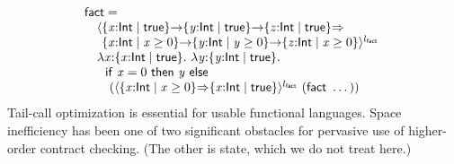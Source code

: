 \documentclass[9pt]{extarticle}
\newcommand{\ottsym}[1]{#1}
\begin{document}
\[ \begin{array}{r@{}l}
  \multicolumn{2}{l}{ \mathsf{fact}  = } \\
  ~~~ &  \langle    \{ \mathit{x} \mathord{:}  \mathsf{Int}  \mathrel{\mid}  \mathsf{true}  \}  \mathord{ \rightarrow }   \{ \mathit{y} \mathord{:}  \mathsf{Int}  \mathrel{\mid}  \mathsf{true}  \}  \mathord{ \rightarrow }  \{ \mathit{z} \mathord{:}  \mathsf{Int}  \mathrel{\mid}  \mathsf{true}  \}     \mathord{ \overset{    }{\Rightarrow} }    {} \\  &  \phantom{\langle}   \{ \mathit{x} \mathord{:}  \mathsf{Int}  \mathrel{\mid}  \mathit{x}  \mathrel{\ge}  \ottsym{0}  \}  \mathord{ \rightarrow }  \{ \mathit{y} \mathord{:}  \mathsf{Int}  \mathrel{\mid}  \mathit{y}  \mathrel{\ge}  \ottsym{0}  \}   \mathord{ \rightarrow }  \{ \mathit{z} \mathord{:}  \mathsf{Int}  \mathrel{\mid}  \mathit{x}  \mathrel{\ge}  \ottsym{0}  \}    \rangle^{  l_{ \mathsf{fact} }  } ~  {} \\  &   \lambda \mathit{x} \mathord{:}  \{ \mathit{x} \mathord{:}  \mathsf{Int}  \mathrel{\mid}  \mathsf{true}  \}  .~   \lambda \mathit{y} \mathord{:}  \{ \mathit{y} \mathord{:}  \mathsf{Int}  \mathrel{\mid}  \mathsf{true}  \}  .~  {} \\  &   ~~   \mathsf{if}~  \mathit{x}  \mathrel{=}  \ottsym{0}  ~\mathsf{then}~ \mathit{y} ~\mathsf{else}~ {} \\  &  \quad   (  \langle   \{ \mathit{x} \mathord{:}  \mathsf{Int}  \mathrel{\mid}  \mathit{x}  \mathrel{\ge}  \ottsym{0}  \}   \mathord{ \overset{    }{\Rightarrow} }   \{ \mathit{x} \mathord{:}  \mathsf{Int}  \mathrel{\mid}  \mathsf{true}  \}   \rangle^{  l_{ \mathsf{fact} }  } ~   (   \mathsf{fact}  ~ \dots  )   )      
\end{array} \]
Tail-call optimization is essential for usable functional
languages. Space inefficiency has been one of two
significant obstacles for pervasive use of higher-order contract
checking. (The other is state, which we do not treat here.)

\medskip
\end{document}
